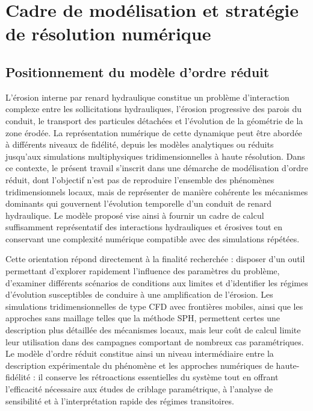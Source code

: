 \documentclass[11pt,a4paper]{report}
\begin{document}
\chapter{Cadre de modélisation et stratégie de résolution numérique}
\label{chap:cadre}

\section{Positionnement du modèle d'ordre réduit}
\label{sec:positionnement}

L'érosion interne par renard hydraulique constitue un problème d'interaction complexe entre les
sollicitations hydrauliques, l'érosion progressive des parois du conduit, le transport des particules
détachées et l'évolution de la géométrie de la zone érodée. La représentation numérique de cette
dynamique peut être abordée à différents niveaux de fidélité, depuis les modèles analytiques ou réduits
jusqu'aux simulations multiphysiques tridimensionnelles à haute résolution. Dans ce contexte, le présent
travail s'inscrit dans une démarche de modélisation d'ordre réduit, dont l'objectif n'est pas de
reproduire l'ensemble des phénomènes tridimensionnels locaux, mais de représenter de manière cohérente
les mécanismes dominants qui gouvernent l'évolution temporelle d'un conduit de renard hydraulique. Le
modèle proposé vise ainsi à fournir un cadre de calcul suffisamment représentatif des interactions
hydrauliques et érosives tout en conservant une complexité numérique compatible avec des simulations
répétées.

Cette orientation répond directement à la finalité recherchée : disposer d'un outil permettant
d'explorer rapidement l'influence des paramètres du problème, d'examiner différents scénarios de
conditions aux limites et d'identifier les régimes d'évolution susceptibles de conduire à une
amplification de l'érosion. Les simulations tridimensionnelles de type CFD avec frontières mobiles,
ainsi que les approches sans maillage telles que la méthode SPH, permettent certes une description plus
détaillée des mécanismes locaux, mais leur coût de calcul limite leur utilisation dans des campagnes
comportant de nombreux cas paramétriques. Le modèle d'ordre réduit constitue ainsi un niveau
intermédiaire entre la description expérimentale du phénomène et les approches numériques de
haute-fidélité : il conserve les rétroactions essentielles du système tout en offrant l'efficacité
nécessaire aux études de criblage paramétrique, à l'analyse de sensibilité et à l'interprétation rapide
des régimes transitoires.
\end{document}
